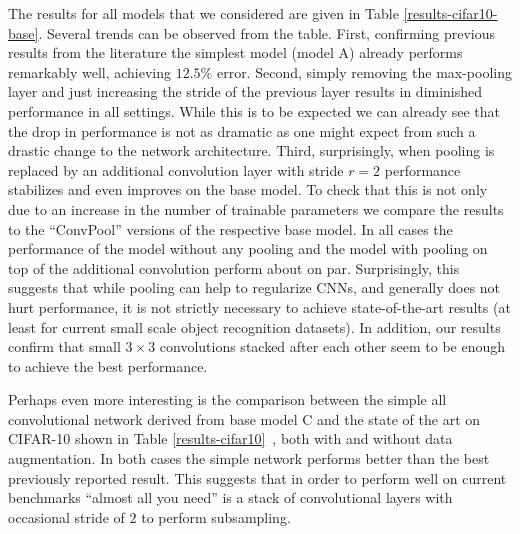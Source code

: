 \documentclass{article} %
\begin{document}
The results for all models that we considered are given in Table \ref{results-cifar10-base}.
Several trends can be observed from the table. First, confirming
previous results from the literature \citep{Srivastava14a} the simplest
model (model A) already performs remarkably well, achieving $12.5 \%$
error. Second, simply removing the max-pooling layer and just increasing the
stride of the previous layer results in diminished performance in all
settings. While this is to be expected we can already see that the
drop in performance is not as dramatic as one might expect from such a
drastic change to the network architecture.
Third, surprisingly, when pooling is replaced by an additional convolution layer
with stride $r = 2$ performance stabilizes and even improves on the
base model. To check that this is not only due to
an increase in the number of trainable parameters we compare the results to the \mbox{``ConvPool''}
versions of the respective base model. In all cases the performance of
the model without any pooling and the model with pooling on top of the
additional convolution perform about on par. Surprisingly, this suggests that while
pooling can help to regularize CNNs, and generally does not hurt
performance, it is not strictly necessary to achieve state-of-the-art
results (at least for current small scale object recognition
datasets). In addition, our results confirm that small $3\times3$
convolutions stacked after each other seem to be enough to achieve the
best performance.

Perhaps even more interesting is the comparison between the simple all
convolutional network derived from base model C and the state of the art on CIFAR-10 shown in Table
\ref{results-cifar10}~, both with and without data augmentation. In both
cases the simple network performs better than the best previously
reported result.
This suggests that in order to perform well on
current benchmarks ``almost all you need'' is a stack of convolutional
layers with occasional stride of $2$ to perform subsampling. 
\end{document}
